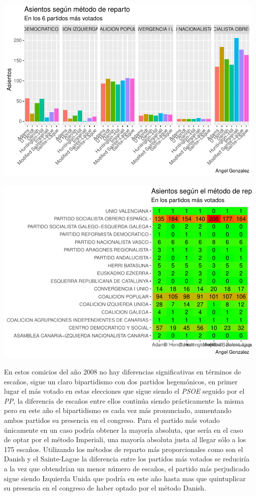 \documentclass[12pt,a4paper,]{book}
\numberwithin{dummy}{section}
\theoremstyle{ocrenumbox}
\theoremstyle{blacknumex}
\theoremstyle{blacknumbox}
\theoremstyle{ocrenum}
\theoremstyle{ocrenum}
\begin{document}
\begin{center}\includegraphics[width=0.95\linewidth]{figurasR/unnamed-chunk-92-1} \end{center}

\begin{center}\includegraphics[width=0.95\linewidth]{figurasR/unnamed-chunk-92-2} \end{center}

En estos comicios del año 2008 no hay diferencias significativas en
términos de escaños, sigue un claro bipartidismo con dos partidos
hegemónicos, en primer lugar el más votado en estas elecciones que sigue
siendo el \emph{PSOE} seguido por el \emph{PP}, la diferencia de escaños
entre ellos continúa siendo prácticamente la misma pero en este año el
bipartidismo es cada vez más pronunciado, aumentando ambos partidos su
presencia en el congreso. Para el partido más votado únicamente en un
caso podría obtener la mayoría absoluta, que sería en el caso de optar
por el método Imperiali, una mayoría absoluta justa al llegar sólo a los
175 escaños. Utilizando los métodos de reparto más proporcionales como
son el Danish y el Sainte-Lague la diferencia entre los partidos más
votados se reduciría a la vez que obtendrían un menor número de escaños,
el partido más perjudicado sigue siendo Izquierda Unida que podría en
este año hasta mas que quintuplicar su presencia en el congreso de haber
optado por el método Danish.
\end{document}
